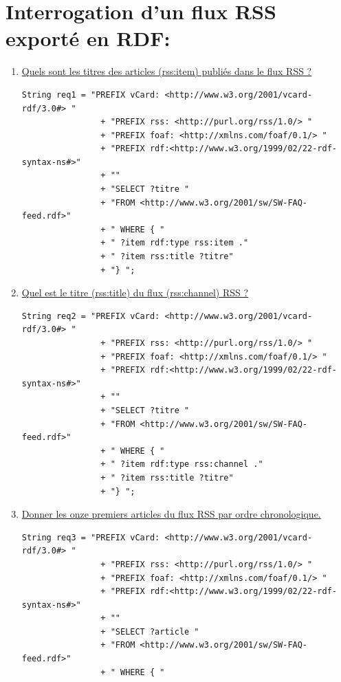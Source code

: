 \documentclass[12pt,a4paper]{article}
\begin{document}
    \section{Interrogation d'un flux RSS exporté en RDF:}
    \begin{justify}
        \begin{enumerate}
            \item \underline{Quels sont les titres des articles (rss:item) publiés dans le flux RSS ?}
            \begin{verbatim}
String req1 = "PREFIX vCard: <http://www.w3.org/2001/vcard-rdf/3.0#> "
                + "PREFIX rss: <http://purl.org/rss/1.0/> "
                + "PREFIX foaf: <http://xmlns.com/foaf/0.1/> "
                + "PREFIX rdf:<http://www.w3.org/1999/02/22-rdf-syntax-ns#>"
                + ""
                + "SELECT ?titre "
                + "FROM <http://www.w3.org/2001/sw/SW-FAQ-feed.rdf>"
                + " WHERE { "
                + " ?item rdf:type rss:item ."
                + " ?item rss:title ?titre"
                + "} ";
            \end{verbatim}
            \item \underline{Quel est le titre (rss:title) du flux (rss:channel) RSS ?}
            \begin{verbatim}
String req2 = "PREFIX vCard: <http://www.w3.org/2001/vcard-rdf/3.0#> "
                + "PREFIX rss: <http://purl.org/rss/1.0/> "
                + "PREFIX foaf: <http://xmlns.com/foaf/0.1/> "
                + "PREFIX rdf:<http://www.w3.org/1999/02/22-rdf-syntax-ns#>"
                + ""
                + "SELECT ?titre "
                + "FROM <http://www.w3.org/2001/sw/SW-FAQ-feed.rdf>"
                + " WHERE { "
                + " ?item rdf:type rss:channel ."
                + " ?item rss:title ?titre"
                + "} ";
            \end{verbatim}
            \item \underline{Donner les onze premiers articles du flux RSS par ordre chronologique.}
            \begin{verbatim}
String req3 = "PREFIX vCard: <http://www.w3.org/2001/vcard-rdf/3.0#> "
                + "PREFIX rss: <http://purl.org/rss/1.0/> "
                + "PREFIX foaf: <http://xmlns.com/foaf/0.1/> "
                + "PREFIX rdf:<http://www.w3.org/1999/02/22-rdf-syntax-ns#>"
                + ""
                + "SELECT ?article "
                + "FROM <http://www.w3.org/2001/sw/SW-FAQ-feed.rdf>"
                + " WHERE { "

\end{verbatim}
\end{enumerate}
\end{justify}
\end{document}
